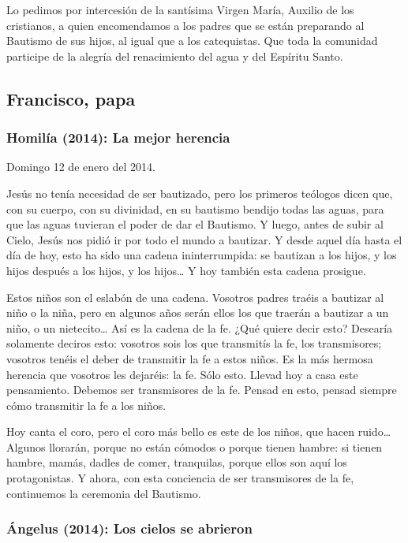 \begin{body}
\begin{body}
{Lo pedimos por intercesión de la santísima Virgen María, Auxilio de los cristianos, a quien encomendamos a los padres que se están preparando al Bautismo de sus hijos, al igual que a los catequistas. Que toda la comunidad participe de la alegría del renacimiento del agua y del Espíritu Santo.

\subsection{Francisco, papa}

\subsubsection{Homilía (2014): La mejor herencia}

Domingo 12 de enero del 2014.

Jesús no tenía necesidad de ser bautizado, pero los primeros teólogos dicen que, con su cuerpo, con su divinidad, en su bautismo bendijo todas las aguas, para que las aguas tuvieran el poder de dar el Bautismo. Y luego, antes de subir al Cielo, Jesús nos pidió ir por todo el mundo a bautizar. Y desde aquel día hasta el día de hoy, esto ha sido una cadena ininterrumpida: se bautizan a los hijos, y los hijos después a los hijos, y los hijos\ldots{} Y hoy también esta cadena prosigue.

Estos niños son el eslabón de una cadena. Vosotros padres traéis a bautizar al niño o la niña, pero en algunos años serán ellos los que traerán a bautizar a un niño, o un nietecito\ldots{} Así es la cadena de la fe. ¿Qué quiere decir esto? Desearía solamente deciros esto: vosotros sois los que transmitís la fe, los transmisores; vosotros tenéis el deber de transmitir la fe a estos niños. Es la más hermosa herencia que vosotros les dejaréis: la fe. Sólo esto. Llevad hoy a casa este pensamiento. Debemos ser transmisores de la fe. Pensad en esto, pensad siempre cómo transmitir la fe a los niños.

Hoy canta el coro, pero el coro más bello es este de los niños, que hacen ruido\ldots{} Algunos llorarán, porque no están cómodos o porque tienen hambre: si tienen hambre, mamás, dadles de comer, tranquilas, porque ellos son aquí los protagonistas. Y ahora, con esta conciencia de ser transmisores de la fe, continuemos la ceremonia del Bautismo.

\subsubsection{Ángelus (2014): Los cielos se abrieron}

}
\end{body}
\end{body}
